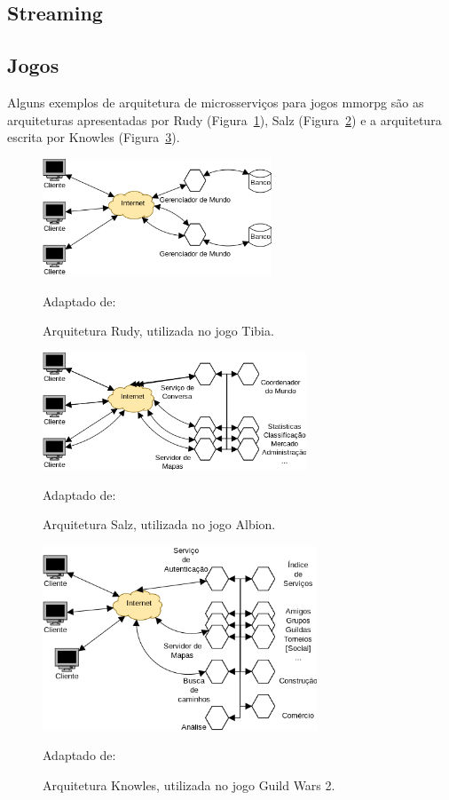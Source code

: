 \subsection{Streaming}

\subsection{Jogos}

Alguns exemplos de arquitetura de microsserviços para jogos \ac{mmorpg} são as arquiteturas apresentadas por Rudy (Figura~\ref{fig:rudy}), Salz (Figura~\ref{fig:salz}) e a arquitetura escrita por Knowles (Figura~\ref{fig:knowles}).


\begin{figure}[htb!]
  \caption{Arquitetura Rudy, utilizada no jogo Tibia.}
  \label{fig:rudy}
  \includegraphics[height=3.5cm]{arquiteturas/rudy.png}
  \centering

  Adaptado de:~\cite{matthiasrudy2011}
\end{figure}


\begin{figure}[htb!]
  \caption{Arquitetura Salz, utilizada no jogo Albion.}
  \label{fig:salz}
  \includegraphics[height=3.5cm]{arquiteturas/salz.png}
  \centering

  Adaptado de:~\cite{albion_online_unite}
\end{figure}%

\begin{figure}[htb!]
  \caption{Arquitetura Knowles, utilizada no jogo Guild Wars 2.}
  \label{fig:knowles}
  \includegraphics[height=5.5cm]{arquiteturas/knowles.png}
  \centering

  Adaptado de:~\cite{stephenclarkewillson2017}
\end{figure}

